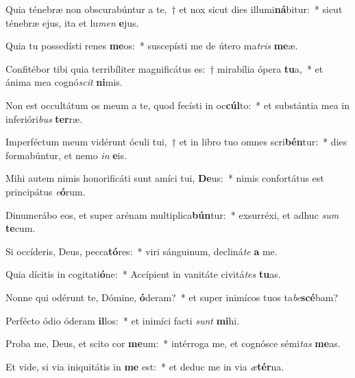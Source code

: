 \item Quia ténebræ non obscurabúntur a te,~† et nox sicut dies illumi\textbf{ná}bitur:~* sicut ténebræ ejus, ita et lu\textit{men} \textbf{e}jus.
\item Quia tu possedísti renes \textbf{me}os:~* suscepísti me de útero ma\textit{tris} \textbf{me}æ.
\item Confitébor tibi quia terribíliter magnificátus es:~† mirabília ópera \textbf{tu}a,~* et ánima mea cognó\textit{scit} \textbf{ni}mis.
\item Non est occultátum os meum a te, quod fecísti in oc\textbf{cúl}to:~* et substántia mea in inferióri\textit{bus} \textbf{ter}ræ.
\item Imperféctum meum vidérunt óculi tui,~† et in libro tuo omnes scri\textbf{bén}tur:~* dies formabúntur, et nemo \textit{in} \textbf{e}is.
\item Mihi autem nimis honorificáti sunt amíci tui, \textbf{De}us:~* nimis confortátus est principátus \textit{e}\textbf{ó}rum.
\item Dinumerábo eos, et super arénam multiplica\textbf{bún}tur:~* exsurréxi, et adhuc \textit{sum} \textbf{te}cum.
\item Si occíderis, Deus, pecca\textbf{tó}res:~* viri sánguinum, decliná\textit{te} \textbf{a} me.
\item Quia dícitis in cogitati\textbf{ó}ne:~* Accípient in vanitáte civitá\textit{tes} \textbf{tu}as.
\item Nonne qui odérunt te, Dómine, \textbf{ó}deram?~* et super inimícos tuos ta\textit{be}\textbf{scé}bam?
\item Perfécto ódio óderam \textbf{il}los:~* et inimíci facti \textit{sunt} \textbf{mi}hi.
\item Proba me, Deus, et scito cor \textbf{me}um:~* intérroga me, et cognósce sémi\textit{tas} \textbf{me}as.
\item Et vide, si via iniquitátis in \textbf{me} est:~* et deduc me in via \textit{æ}\textbf{tér}na.

